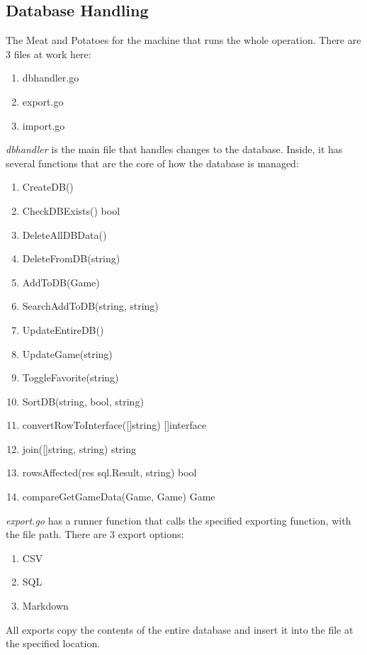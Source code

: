 \subsection{Database Handling}
\label{subsec:DBHandling}

The Meat and Potatoes for the machine that runs the whole operation.
There are 3 files at work here:
\begin{enumerate}
	\item dbhandler.go
	\item export.go
	\item import.go
\end{enumerate}

\textit{dbhandler} is the main file that handles changes to the database.
Inside, it has several functions that are the core of how the
database is managed:
\begin{enumerate}
	\item CreateDB()
	\item CheckDBExists() bool
	\item DeleteAllDBData()
	\item DeleteFromDB(string)
	\item AddToDB(Game)
	\item SearchAddToDB(string, string)
	\item UpdateEntireDB()
	\item UpdateGame(string)
	\item ToggleFavorite(string)
	\item SortDB(string, bool, string)
	\item convertRowToInterface([]string) []interface{}
	\item join([]string, string) string
	\item rowsAffected(res sql.Result, string) bool
	\item compareGetGameData(Game, Game) Game
\end{enumerate}

\textit{export.go} has a runner function that calls the specified
exporting function, with the file path.
There are 3 export options:
\begin{enumerate}
	\item CSV
	\item SQL
	\item Markdown
\end{enumerate}

All exports copy the contents of the entire database and insert it
into the file at the specified location.

